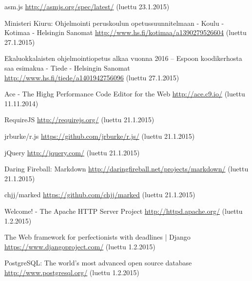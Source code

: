 \begin{thebibliography}{99}
	asm.js \url{http://asmjs.org/spec/latest/} (luettu 23.1.2015)

	Ministeri Kiuru: Ohjelmointi peruskoulun opetussuunnitelmaan - Koulu - Kotimaa - Helsingin Sanomat \url{http://www.hs.fi/kotimaa/a1390279526604} (luettu 27.1.2015)
	
	Ekaluokkalaisten ohjelmointiopetus alkaa vuonna 2016 – Espoon koodikerhosta saa esimakua - Tiede - Helsingin Sanomat \url{http://www.hs.fi/tiede/a1401942756096} (luettu 27.1.2015)

	Ace - The Highg Performance Code Editor for the Web \url{http://ace.c9.io/} (luettu 11.11.2014)

	RequireJS \url{http://requirejs.org/} (luettu 21.1.2015)
	
	jrburke/r.js \url{https://github.com/jrburke/r.js/} (luettu 21.1.2015)
	
	jQuery \url{http://jquery.com/} (luettu 21.1.2015)

	Daring Fireball: Markdown \url{http://daringfireball.net/projects/markdown/} (luettu 21.1.2015)
	
	chjj/marked \url{https://github.com/chjj/marked} (luettu 21.1.2015)
	
	Welcome! - The Apache HTTP Server Project \url{http://httpd.apache.org/} (luettu 1.2.2015)

	The Web framework for perfectionists with deadlines | Django \url{https://www.djangoproject.com/} (luettu 1.2.2015)

	PostgreSQL: The world's most advanced open source database \url{http://www.postgresql.org/} (luettu 1.2.2015)

\end{thebibliography}

